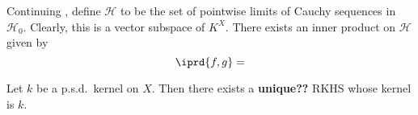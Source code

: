 	
	\begin{lem}
		Continuing , define $\mathscr H$ to be the set of pointwise limits of Cauchy sequences in $\mathscr H_0$. Clearly, this is a vector subspace of $K^X$. There exists an inner product on $\mathscr H$ given by
		\[
		\iprd{f, g} = 
		\]
	\end{lem}
	
	
	
	\begin{thm}\label{THM: Moore-Aronszajn}
		Let $k$ be a p.s.d.\ kernel on $X$. Then there exists a \textbf{unique??} RKHS whose kernel is $k$.
	\end{thm}
	
	